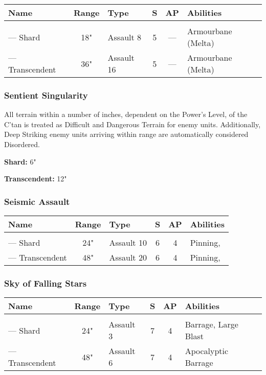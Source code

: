 \noindent
\begin{NiceTabular}{L{115 pt} c C{40pt} *{2}{c} >{\raggedright\arraybackslash}p{240pt}}
	Name & Range & Type & S & AP & Abilities \\
	\hline
	 &  &  &  &  & \\
	— Shard & 18" & Assault 8 & 5 & — & Armourbane (Melta) \\
	 — Transcendent  & 36" & Assault 16 & 5 & — & Armourbane (Melta) \\
\end{NiceTabular}

\subsubsection{Sentient Singularity} \label{Sentient Singularity}

All terrain within a number of inches, dependent on the Power's Level, of the C'tan is treated as Difficult and Dangerous Terrain for enemy units. Additionally, Deep Striking enemy units arriving within range are automatically considered Disordered.

\textbf{Shard:} 6"

\textbf{Transcendent:} 12"

\subsubsection{Seismic Assault} \label{Seismic Assault}

\noindent
\begin{NiceTabular}{L{115 pt} c C{40pt} *{2}{c} >{\raggedright\arraybackslash}p{240pt}}
	Name & Range & Type & S & AP & Abilities \\
	\hline
	 &  &  &  &  & \\
	— Shard & 24" & Assault 10 & 6 & 4 & Pinning,  \\
	 — Transcendent & 48" & Assault 20 & 6 & 4 & Pinning,  \\
\end{NiceTabular}

\subsubsection{Sky of Falling Stars} \label{Sky of Falling Stars}

\noindent
\begin{NiceTabular}{L{115 pt} c C{40pt} *{2}{c} >{\raggedright\arraybackslash}p{240pt}}
	Name & Range & Type & S & AP & Abilities \\
	\hline
	 &  &  &  &  & \\
	— Shard  & 24" & Assault 3 & 7 & 4 & Barrage, Large Blast \\
	 — Transcendent & 48" & Assault 6 & 7 & 4 & Apocalyptic Barrage \\
\end{NiceTabular}

